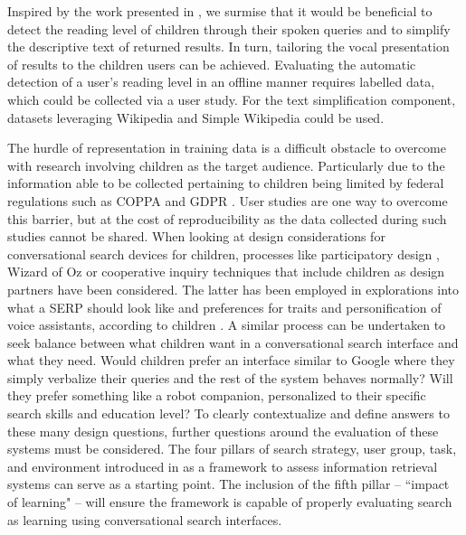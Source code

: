 \documentclass{sigchi-ext}
\begin{document}
Inspired by the work presented in \cite{beelen2021does,landoni2019sonny}, we surmise that it would be beneficial to %
detect the reading level of children through their spoken queries and to simplify the descriptive text of returned results. In turn, tailoring the vocal presentation of results to the children users can be achieved. Evaluating the automatic detection of a user's reading level in an offline manner requires labelled data, which could be collected via a user study. For the text simplification component, datasets leveraging Wikipedia and Simple Wikipedia %
could be used.%

The hurdle of representation in training data is a difficult obstacle to overcome with research involving children as the target audience. Particularly due to the information able to be collected pertaining to children being limited by federal regulations such as COPPA and GDPR \cite{rights2017privacy,federal1998children}. User studies are one way to overcome this barrier, but at the cost of reproducibility as the data collected during such studies cannot be shared. When looking at design considerations for conversational search devices for children, processes like participatory design \cite{robertson2012participatory}, Wizard of Oz \cite{steinfeld2009oz} or cooperative inquiry techniques \cite{druin_cooperative_1999,fails2013methods} that include children as design partners have been considered. 
The latter has been employed in explorations into what a SERP should look like and preferences for traits and personification of voice assistants, according to children \cite{allen2021engage,landoni2020you,yuan2019speech}. A similar process can be undertaken to seek balance between what children want in a conversational search interface and what they need. Would children prefer an interface similar to Google where they simply verbalize their queries and the rest of the system behaves normally? Will they prefer something like a robot companion, personalized to their specific search skills and education level? To clearly contextualize and define answers to these many design questions, further questions around the evaluation of these systems must be considered. The four pillars of search strategy, user group, task, and environment introduced in \cite{landoni2019sonny} as a framework to assess information retrieval systems can serve as a starting point. The inclusion of the fifth pillar -- ``impact of learning" -- will ensure the framework is capable of properly evaluating search as learning using conversational search interfaces.
\end{document}
